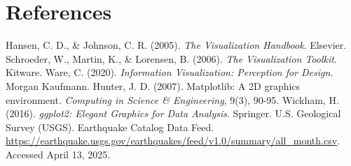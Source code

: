 \documentclass[11pt]{article}
\begin{document}
	\section{References}
	
	\begin{thebibliography}{9}
		 Hansen, C. D., \& Johnson, C. R. (2005). \textit{The Visualization Handbook}. Elsevier.
		 Schroeder, W., Martin, K., \& Lorensen, B. (2006). \textit{The Visualization Toolkit}. Kitware.
		 Ware, C. (2020). \textit{Information Visualization: Perception for Design}. Morgan Kaufmann.
		 Hunter, J. D. (2007). Matplotlib: A 2D graphics environment. \textit{Computing in Science \& Engineering}, 9(3), 90-95.
		 Wickham, H. (2016). \textit{ggplot2: Elegant Graphics for Data Analysis}. Springer.
		U.S. Geological Survey (USGS). Earthquake Catalog Data Feed. \url{https://earthquake.usgs.gov/earthquakes/feed/v1.0/summary/all_month.csv}. Accessed April 13, 2025.
		
	\end{thebibliography}
	
\end{document}
